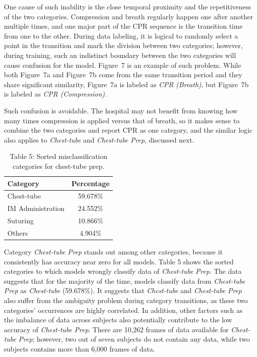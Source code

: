 \documentclass[letterpaper, 10 pt, conference]{ieeeconf}  %
\begin{document}
One cause of such inability is the close temporal proximity and the repetitiveness of the two categories. Compression and breath regularly happen one after another multiple times, and one major part of the CPR sequence is the transition time from one to the other. During data labeling, it is logical to randomly select a point in the transition and mark the division between two categories; however, during training, such an indistinct boundary between the two categories will cause confusion for the model. Figure~7 is an example of such problem. While both Figure~7a and Figure~7b come from the same transition period and they share significant similarity, Figure~7a is labeled as \textit{CPR (Breath)}, but Figure~7b is labeled as \textit{CPR (Compression)}. 

Such confusion is avoidable. The hospital may not benefit from knowing how many times compression is applied versus that of breath, so it makes sense to combine the two categories and report CPR as one category, and the similar logic also applies to \textit{Chest-tube} and \textit{Chest-tube Prep}, discussed next.

\begin{table}[!htb]
\begin{center}
 \begin{tabular}{||l c ||} 
 \hline
Category & Percentage \\ [0.5ex] 
 \hline\hline
Chest-tube & 59.678\%  \\ 
 \hline
IM Administration & 24.552\%  \\ 
  \hline
Suturing & 10.866\%  \\ 
 \hline
Others & 4.904\%  \\ 
 \hline
\end{tabular}
\caption{Table 5: Sorted misclassification categories for chest-tube prep.}
\end{center}
\end{table}

Category \textit{Chest-tube Prep} stands out among other categories, because it consistently has accuracy near zero for all models. Table 5 shows the sorted categories to which models wrongly classify data of \textit{Chest-tube Prep}. The data suggests that for the majority of the time, models classify data from \textit{Chest-tube Prep} as \textit{Chest-tube} (59.678\%). It suggests that \textit{Chest-tube} and \textit{Chest-tube Prep} also suffer from the ambiguity problem during category transitions, as these two categories' occurrences are highly correlated. In addition, other factors such as the imbalance of data across subjects also potentially contribute to the low accuracy of \textit{Chest-tube Prep}. There are 10,262 frames of data available for \textit{Chest-tube Prep}; however,  two out of seven subjects do not contain any data, while  two subjects contains more than 6,000 frames of data. 
\end{document}
